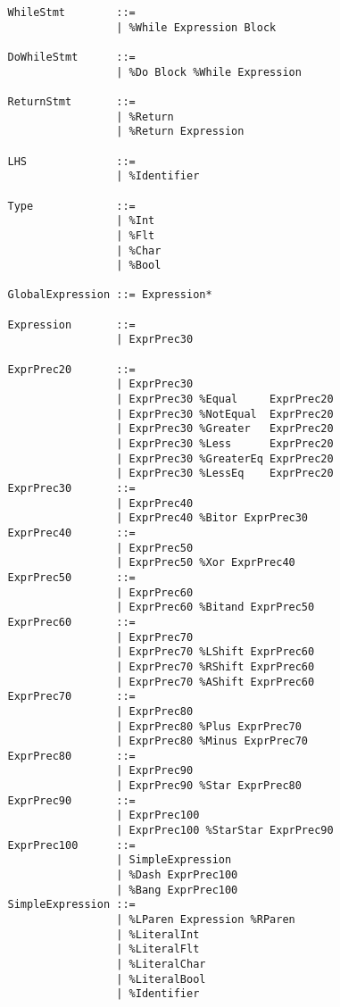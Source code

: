 \documentclass{article}
\begin{document}
\begin{verbatim}
				WhileStmt        ::=
				                 | %While Expression Block
				
				DoWhileStmt      ::=
				                 | %Do Block %While Expression
				                 
				ReturnStmt       ::=
				                 | %Return
				                 | %Return Expression
				                 
				LHS              ::=
				                 | %Identifier
				                 
				Type             ::=
				                 | %Int
				                 | %Flt
				                 | %Char
				                 | %Bool
				                 
				GlobalExpression ::= Expression*
			
				Expression       ::=
				                 | ExprPrec30
				
				ExprPrec20       ::= 
				                 | ExprPrec30
				                 | ExprPrec30 %Equal     ExprPrec20
				                 | ExprPrec30 %NotEqual  ExprPrec20
				                 | ExprPrec30 %Greater   ExprPrec20
				                 | ExprPrec30 %Less      ExprPrec20
				                 | ExprPrec30 %GreaterEq ExprPrec20
				                 | ExprPrec30 %LessEq    ExprPrec20
				ExprPrec30       ::=
				                 | ExprPrec40
				                 | ExprPrec40 %Bitor ExprPrec30
				ExprPrec40       ::=
				                 | ExprPrec50
				                 | ExprPrec50 %Xor ExprPrec40
				ExprPrec50       ::=
				                 | ExprPrec60
				                 | ExprPrec60 %Bitand ExprPrec50
				ExprPrec60       ::=
				                 | ExprPrec70
				                 | ExprPrec70 %LShift ExprPrec60
				                 | ExprPrec70 %RShift ExprPrec60
				                 | ExprPrec70 %AShift ExprPrec60
				ExprPrec70       ::=
				                 | ExprPrec80
				                 | ExprPrec80 %Plus ExprPrec70
				                 | ExprPrec80 %Minus ExprPrec70
				ExprPrec80       ::=
				                 | ExprPrec90
				                 | ExprPrec90 %Star ExprPrec80
				ExprPrec90       ::=
				                 | ExprPrec100
				                 | ExprPrec100 %StarStar ExprPrec90
				ExprPrec100      ::=
				                 | SimpleExpression
				                 | %Dash ExprPrec100
				                 | %Bang ExprPrec100
				SimpleExpression ::=
				                 | %LParen Expression %RParen
				                 | %LiteralInt
				                 | %LiteralFlt
				                 | %LiteralChar
				                 | %LiteralBool
				                 | %Identifier
			\end{verbatim}
	
\end{document}
